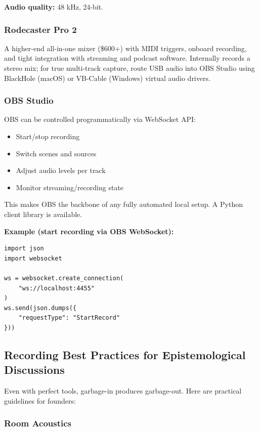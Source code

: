 \documentclass[11pt,letterpaper]{article}
\begin{document}
\textbf{Audio quality:} 48 kHz, 24-bit.

\subsubsection{Rodecaster Pro 2}

A higher-end all-in-one mixer (\$600+) with MIDI triggers, onboard recording, and tight integration with streaming and podcast software. Internally records a stereo mix; for true multi-track capture, route USB audio into OBS Studio using BlackHole (macOS) or VB-Cable (Windows) virtual audio drivers.

\subsubsection{OBS Studio}

OBS can be controlled programmatically via WebSocket API:

\begin{itemize}
  \item Start/stop recording
  \item Switch scenes and sources
  \item Adjust audio levels per track
  \item Monitor streaming/recording state
\end{itemize}

This makes OBS the backbone of any fully automated local setup. A Python client library is available.

\textbf{Example (start recording via OBS WebSocket):}
\begin{verbatim}
import json
import websocket

ws = websocket.create_connection(
    "ws://localhost:4455"
)
ws.send(json.dumps({
    "requestType": "StartRecord"
}))
\end{verbatim}

\subsection{Recording Best Practices for Epistemological Discussions}

Even with perfect tools, garbage-in produces garbage-out. Here are practical guidelines for founders:

\subsubsection{Room Acoustics}
\end{document}
